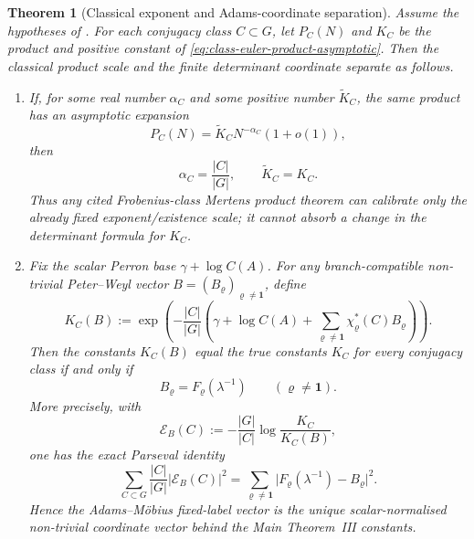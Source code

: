 \documentclass[11pt,a4paper]{amsart}
\theoremstyle{plain}
\newtheorem{theorem}{Theorem}[section]
\theoremstyle{definition}
\theoremstyle{remark}
\newcommand{\abs}[1]{\lvert #1 \rvert}
\begin{document}
\begin{theorem}[Classical exponent and Adams-coordinate separation]
  \label{thm:class-product-novelty-boundary}
  Assume the hypotheses of .  For each
  conjugacy class \(C\subset G\), let \(P_C(N)\) and \(K_C\) be the product and
  positive constant of \eqref{eq:class-euler-product-asymptotic}.  Then the
  classical product scale and the finite determinant coordinate separate as
  follows.
  \begin{enumerate}[label=\textup{(\alph*)}]
    \item If, for some real number \(\alpha_C\) and some positive number
    \(\widetilde K_C\), the same product has an asymptotic expansion
    \[
      P_C(N)=\widetilde K_C N^{-\alpha_C}(1+o(1)),
    \]
    then
    \[
      \alpha_C=\frac{|C|}{|G|},
      \qquad
      \widetilde K_C=K_C.
    \]
    Thus any cited Frobenius-class Mertens product theorem can calibrate only
    the already fixed exponent/existence scale; it cannot absorb a change in
    the determinant formula for \(K_C\).
    \item Fix the scalar Perron base \(\gamma+\log C(A)\).  For any
    branch-compatible non-trivial Peter--Weyl vector
    \(B=(B_\varrho)_{\varrho\ne\mathbf1}\), define
    \[
      K_C(B):=
      \exp\!\left(
        -\frac{|C|}{|G|}
        \left(
          \gamma+\log C(A)+
          \sum_{\varrho\ne\mathbf1}\chi_\varrho^\ast(C)B_\varrho
        \right)
      \right).
    \]
    Then the constants \(K_C(B)\) equal the true constants \(K_C\) for every
    conjugacy class if and only if
    \[
      B_\varrho=F_\varrho(\lambda^{-1})
      \qquad(\varrho\ne\mathbf1).
    \]
    More precisely, with
    \[
      \mathscr E_B(C):=-\frac{|G|}{|C|}\log\frac{K_C}{K_C(B)},
    \]
    one has the exact Parseval identity
    \[
      \sum_{C\subset G}\frac{|C|}{|G|}\abs{\mathscr E_B(C)}^2
      =
      \sum_{\varrho\ne\mathbf1}
        \abs{F_\varrho(\lambda^{-1})-B_\varrho}^2 .
    \]
    Hence the Adams--M\"obius fixed-label vector is the unique
    scalar-normalised non-trivial coordinate vector behind the Main
    Theorem~III constants.
  \end{enumerate}
\end{theorem}
\end{document}
